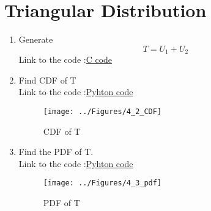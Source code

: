 \documentclass[journal,12pt,twocolumn]{IEEEtran}
\renewcommand\thesection{\arabic{section}}
\begin{document}
\section{Triangular Distribution}
\begin{enumerate}[label=\thesection.\arabic*
,ref=\thesection.\theenumi]

\item Generate
\begin{equation}
T = U_1 + U_2
\end{equation}
\solution Link to the code :\href{https://github.com/anikettsatpute/Probability-and-Random-Variable-Assignment/blob/main/code/code4_1.c}{C code}
\vspace{0.2in}

\item Find CDF of T\\
\solution Link to the code :\href{https://github.com/anikettsatpute/Probability-and-Random-Variable-Assignment/blob/main/code/code4_2.py}{Pyhton code}\\

\begin{figure}[h]
\centering
\texttt{[image: ../Figures/4\_2\_CDF]}
\caption{CDF of T}
\label{fig:gauss_pdf}
\end{figure}

\item Find the PDF of T.\\
\solution Link to the code :\href{https://github.com/anikettsatpute/Probability-and-Random-Variable-Assignment/blob/main/code/code4_3.py}{Pyhton code}\\
\begin{figure}[h]
\centering
\texttt{[image: ../Figures/4\_3\_pdf]}
\caption{PDF of T}
\label{fig:gauss_pdf}
\end{figure}


\end{enumerate}
\end{document}
